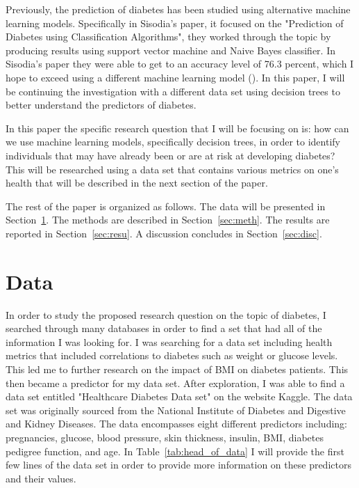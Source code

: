 \documentclass[12pt]{article}
\begin{document}
    Previously, the prediction of diabetes has been studied using alternative machine learning models. Specifically in Sisodia's paper, it focused
    on the "Prediction of Diabetes using Classification Algorithms", they worked through the topic by producing results using support 
    vector machine and Naive Bayes classifier. In Sisodia's paper they were able to get to an accuracy level of 76.3 percent, which I hope to exceed using
    a different machine learning model (\cite{Sisodia2018Prediction}). In this paper, I will be 
    continuing the investigation with a different data set using decision trees to better understand the predictors of diabetes.

    In this paper the specific research question that I will be focusing on is: how can we use machine learning models, specifically decision trees, in order to identify 
    individuals that may have already been or are at risk at developing diabetes? This will be researched using a data set that contains various 
    metrics on one's health that will be described in the next section of the paper.

    The rest of the paper is organized as follows.
    The data will be presented in Section~\ref{sec:data}.
    The methods are described in Section~\ref{sec:meth}.
    The results are reported in Section~\ref{sec:resu}.
    A discussion concludes in Section~\ref{sec:disc}.

\section{Data}
\label{sec:data}
    In order to study the proposed research question on the topic of diabetes, I searched through many databases in order to find a set 
    that had all of the information I was looking for. I was searching for a data set including health metrics that included correlations to diabetes such as weight 
    or glucose levels. This led me to further research on the impact of BMI on diabetes patients. This then became a predictor for my data set. After exploration, I was
    able to find a data set entitled "Healthcare Diabetes Data set" on the website Kaggle. The data set was originally sourced from the National Institute of Diabetes and 
    Digestive and Kidney Diseases. The data encompasses eight different predictors including: pregnancies, glucose, blood pressure, skin thickness, insulin, BMI, diabetes 
    pedigree function, and age. In Table~\ref{tab:head_of_data} I will provide the first few lines of the data set in order to provide
    more information on these predictors and their values. 
\end{document}
